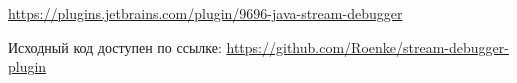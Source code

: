 \begin{frame}
\frametitle{\insertsection} 
\framesubtitle{\insertsubsection}
\href{https://plugins.jetbrains.com/plugin/9696-java-stream-debugger}{https://plugins.jetbrains.com/plugin/9696-java-stream-debugger}


Исходный код доступен по ссылке:
\href{https://github.com/Roenke/stream-debugger-plugin}{https://github.com/Roenke/stream-debugger-plugin}


\end{frame}
